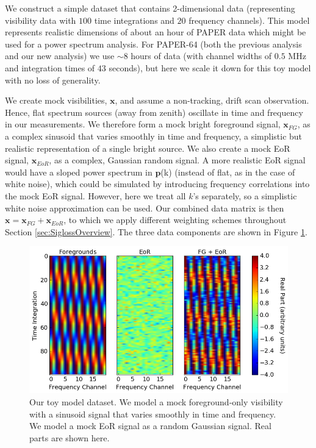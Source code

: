 \documentclass[preprint2,numberedappendix,tighten]{aastex6}  %
\begin{document}
We construct a simple dataset that contains 2-dimensional data (representing visibility data with $100$ time 
integrations and $20$ frequency channels). This model represents realistic dimensions of about an hour of PAPER data which 
might be used for a power spectrum analysis. For PAPER-64 (both the previous analysis and our new analysis) we use $\sim$$8$ hours of data (with channel 
widths of $0.5$ MHz and integration times of $43$ seconds), but here we scale it down for this toy model with no loss of 
generality. 

We create mock visibilities, $\textbf{x}$, and assume a non-tracking, drift scan observation. Hence, flat spectrum sources (away 
from zenith) oscillate in time and frequency in our measurements. We therefore form a mock bright foreground signal, $
\textbf{x}_{FG}$, as a complex sinusoid that varies smoothly in time and frequency, a simplistic but realistic representation of a 
single bright source. We also create a mock EoR signal, $\textbf{x}_{EoR}$, as a complex, Gaussian random signal. A more 
realistic EoR signal would have a sloped power spectrum in $\textbf{p}$(k) (instead of flat, as in the case of white noise), 
which could be simulated by introducing frequency correlations into the mock EoR signal. However, here we treat all 
$k$'s separately, so a simplistic white noise approximation can be used. Our combined data matrix is then $\textbf{x} = 
\textbf{x}_{FG} + \textbf{x}_{EoR}$, to which we apply different weighting schemes throughout Section \ref{sec:SiglossOverview}. The three data components are shown in Figure 
\ref{fig:toy_sigloss1}. 

\begin{figure}
	\centering
	\includegraphics[trim={0cm 0cm 0cm 0cm},clip,width=\columnwidth]{plots/toy_sigloss1.png}
	\caption{Our toy model dataset. We model a mock foreground-only visibility with a sinusoid signal that varies smoothly in 
time and frequency. We model a mock EoR signal as a random Gaussian signal. Real parts are shown here.}
	\label{fig:toy_sigloss1}
\end{figure}
\end{document}
